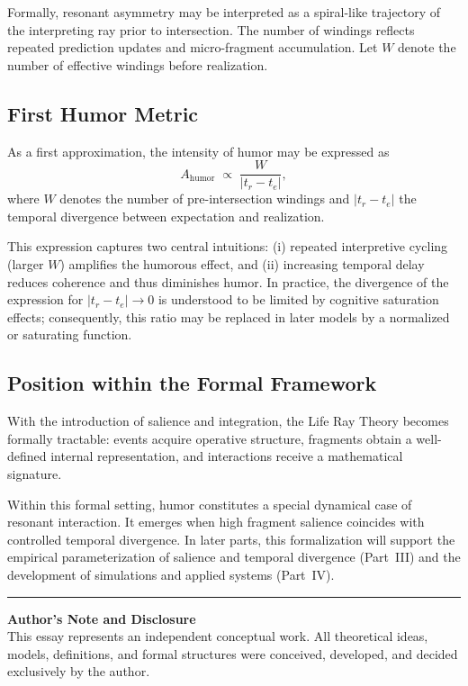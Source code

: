 \documentclass[12pt,a4paper]{article}
\begin{document}
Formally, resonant asymmetry may be interpreted as a spiral-like
trajectory of the interpreting ray prior to intersection.
The number of windings reflects repeated prediction updates and
micro-fragment accumulation.
Let $W$ denote the number of effective windings before realization.

\subsection{First Humor Metric}

As a first approximation, the intensity of humor may be expressed as
\[
A_{\text{humor}} \;\propto\; \frac{W}{\lvert t_r - t_e \rvert},
\]
where $W$ denotes the number of pre-intersection windings and
$\lvert t_r - t_e \rvert$ the temporal divergence between expectation and realization.

This expression captures two central intuitions: 
(i) repeated interpretive cycling (larger $W$) amplifies the humorous effect, and 
(ii) increasing temporal delay reduces coherence and thus diminishes humor.
In practice, the divergence of the expression for $\lvert t_r - t_e \rvert \to 0$ is
understood to be limited by cognitive saturation effects; consequently, this ratio
may be replaced in later models by a normalized or saturating function.

\subsection{Position within the Formal Framework}

With the introduction of salience and integration,
the Life Ray Theory becomes formally tractable:
events acquire operative structure,
fragments obtain a well-defined internal representation,
and interactions receive a mathematical signature.

Within this formal setting, humor constitutes a special dynamical case
of resonant interaction.
It emerges when high fragment salience coincides with controlled
temporal divergence.
In later parts, this formalization will support
the empirical parameterization of salience and temporal divergence
(Part~III) and the development of simulations and applied systems
(Part~IV).

\vspace{4em}
\noindent\rule{\textwidth}{0.4pt}
\vspace{1em}
\footnotesize
\noindent\textbf{Author’s Note and Disclosure} \\ 
This essay represents an independent conceptual work. All theoretical ideas, models, 
definitions, and formal structures were conceived, developed, and decided exclusively 
by the author.
\end{document}

